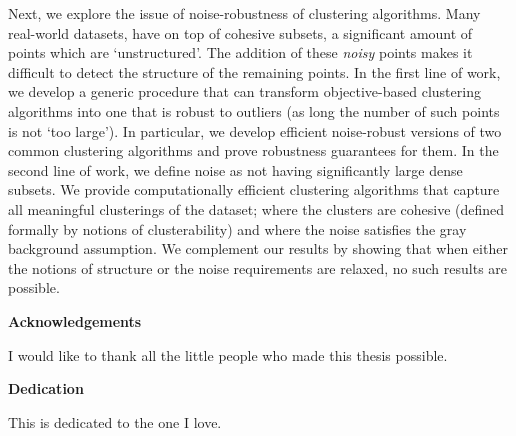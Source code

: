 \documentclass[letterpaper,12pt,titlepage,oneside,final]{book}
\let\origdoublepage\cleardoublepage
\newcommand{\clearemptydoublepage}{%
  \clearpage{\pagestyle{empty}\origdoublepage}}
\let\cleardoublepage\clearemptydoublepage
\begin{document}
Next, we explore the issue of noise-robustness of clustering algorithms. Many real-world datasets, have on top of cohesive subsets, a significant amount of points which are `unstructured'. The addition of these \textit{noisy} points makes it difficult to detect the structure of the remaining points. In the first line of work, we develop a generic procedure that can transform objective-based clustering algorithms into one that is robust to outliers (as long the number of such points is not `too large'). In particular, we develop efficient noise-robust versions of two common clustering algorithms and prove robustness guarantees for them. In the second line of work, we define noise as not having significantly large dense subsets. We provide computationally efficient clustering algorithms that capture all meaningful clusterings of the dataset; where the clusters are cohesive (defined formally by notions of clusterability) and where the noise satisfies the gray background assumption. We complement our results by showing that when either the notions
of structure or the noise requirements are relaxed, no such results are
possible.

   

\cleardoublepage

\begin{center}\textbf{Acknowledgements}\end{center}

I would like to thank all the little people who made this thesis possible.
\cleardoublepage

\begin{center}\textbf{Dedication}\end{center}

This is dedicated to the one I love.
\cleardoublepage

\renewcommand\contentsname{Table of Contents}
\tableofcontents
\cleardoublepage
{}    %

\listoftables
\cleardoublepage
{}		%

\listoffigures
\cleardoublepage
{}		%

{}		%


\ifdefined\COMPLETE
\else
\end{document}
